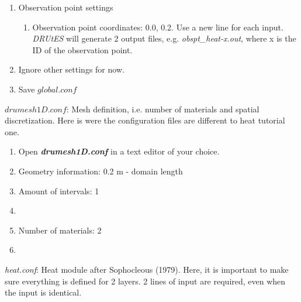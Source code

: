 \begin{enumerate}
\begin{enumerate}
\end{enumerate}
\item Observation point settings \begin{enumerate}
\item Observation point coordinates: 0.0, 0.2. Use a new line for each input. \textit{DRUtES} will generate 2 output files, e.g. \textit{obspt\_heat-x.out}, where x is the ID of the observation point. 
\end{enumerate}
\item Ignore other settings for now. 
\item Save $global.conf$
\end{enumerate}


$drumesh1D.conf$: Mesh definition, i.e. number of materials and spatial discretization. Here is were the configuration files are different to heat tutorial one. 
\begin{enumerate}
\item Open \textbf{\emph{drumesh1D.conf}} in a text editor of your choice. 
\item Geometry information: 0.2 m - domain length
\item Amount of intervals: 1
\item
{}
\item Number of materials: 2
\item {}
\end{enumerate}

\emph{heat.conf}: Heat module after Sophocleous (1979). 
Here, it is important to make sure everything is defined for 2 layers. 2 lines of input are required, even when the input is identical. 

